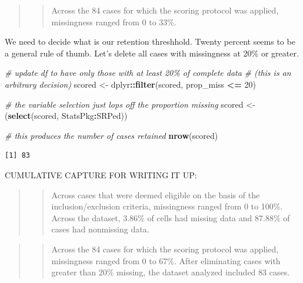 \documentclass[
  11pt,
]{book}
\newenvironment{Shaded}{\begin{snugshade}}{\end{snugshade}}
\newcommand{\CommentTok}[1]{\textcolor[rgb]{0.37,0.37,0.37}{\textit{#1}}}
\newcommand{\DecValTok}[1]{\textcolor[rgb]{0.06,0.06,0.06}{#1}}
\newcommand{\FunctionTok}[1]{\textcolor[rgb]{0.27,0.27,0.27}{\textbf{#1}}}
\newcommand{\NormalTok}[1]{#1}
\newcommand{\OtherTok}[1]{\textcolor[rgb]{0.37,0.37,0.37}{#1}}
\newcommand{\SpecialCharTok}[1]{\textcolor[rgb]{0.43,0.43,0.43}{\textbf{#1}}}
\begin{document}
\begin{quote}
\begin{quote}
Across the 84 cases for which the scoring protocol was applied, missingness ranged from 0 to 33\%.
\end{quote}
\end{quote}

We need to decide what is our retention threshhold. Twenty percent seems to be a general rule of thumb. Let's delete all cases with missingness at 20\% or greater.

\begin{Shaded}
\begin{Highlighting}[]
\CommentTok{\# update df to have only those with at least 20\% of complete data}
\CommentTok{\# (this is an arbitrary decision)}
\NormalTok{scored }\OtherTok{\textless{}{-}}\NormalTok{ dplyr}\SpecialCharTok{::}\FunctionTok{filter}\NormalTok{(scored, prop\_miss }\SpecialCharTok{\textless{}=} \DecValTok{20}\NormalTok{)}

\CommentTok{\# the variable selection just lops off the proportion missing}
\NormalTok{scored }\OtherTok{\textless{}{-}}\NormalTok{ (}\FunctionTok{select}\NormalTok{(scored, StatsPkg}\SpecialCharTok{:}\NormalTok{SRPed))}

\CommentTok{\# this produces the number of cases retained}
\FunctionTok{nrow}\NormalTok{(scored)}
\end{Highlighting}
\end{Shaded}

\begin{verbatim}
[1] 83
\end{verbatim}

CUMULATIVE CAPTURE FOR WRITING IT UP:

\begin{quote}
\begin{quote}
Across cases that were deemed eligible on the basis of the inclusion/exclusion criteria, missingness ranged from 0 to 100\%. Across the dataset, 3.86\% of cells had missing data and 87.88\% of cases had nonmissing data.
\end{quote}
\end{quote}

\begin{quote}
\begin{quote}
Across the 84 cases for which the scoring protocol was applied, missingness ranged from 0 to 67\%. After eliminating cases with greater than 20\% missing, the dataset analyzed included 83 cases.
\end{quote}
\end{quote}
\end{document}
